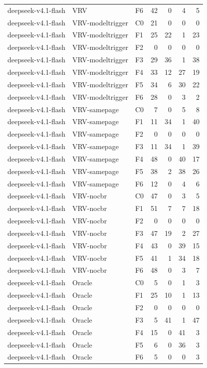 \begin{tabular}{lllrrrr}
deepseek-v4.1-flash & VRV & F6 & 42 & 0 & 4 & 5 \\
deepseek-v4.1-flash & VRV-modeltrigger & C0 & 21 & 0 & 0 & 0 \\
deepseek-v4.1-flash & VRV-modeltrigger & F1 & 25 & 22 & 1 & 23 \\
deepseek-v4.1-flash & VRV-modeltrigger & F2 & 0 & 0 & 0 & 0 \\
deepseek-v4.1-flash & VRV-modeltrigger & F3 & 29 & 36 & 1 & 38 \\
deepseek-v4.1-flash & VRV-modeltrigger & F4 & 33 & 12 & 27 & 19 \\
deepseek-v4.1-flash & VRV-modeltrigger & F5 & 34 & 6 & 30 & 22 \\
deepseek-v4.1-flash & VRV-modeltrigger & F6 & 28 & 0 & 3 & 2 \\
deepseek-v4.1-flash & VRV-samepage & C0 & 7 & 0 & 5 & 8 \\
deepseek-v4.1-flash & VRV-samepage & F1 & 11 & 34 & 1 & 40 \\
deepseek-v4.1-flash & VRV-samepage & F2 & 0 & 0 & 0 & 0 \\
deepseek-v4.1-flash & VRV-samepage & F3 & 11 & 34 & 1 & 39 \\
deepseek-v4.1-flash & VRV-samepage & F4 & 48 & 0 & 40 & 17 \\
deepseek-v4.1-flash & VRV-samepage & F5 & 38 & 2 & 38 & 26 \\
deepseek-v4.1-flash & VRV-samepage & F6 & 12 & 0 & 4 & 6 \\
deepseek-v4.1-flash & VRV-nocbr & C0 & 47 & 0 & 3 & 5 \\
deepseek-v4.1-flash & VRV-nocbr & F1 & 51 & 7 & 7 & 18 \\
deepseek-v4.1-flash & VRV-nocbr & F2 & 0 & 0 & 0 & 0 \\
deepseek-v4.1-flash & VRV-nocbr & F3 & 47 & 19 & 2 & 27 \\
deepseek-v4.1-flash & VRV-nocbr & F4 & 43 & 0 & 39 & 15 \\
deepseek-v4.1-flash & VRV-nocbr & F5 & 41 & 1 & 34 & 18 \\
deepseek-v4.1-flash & VRV-nocbr & F6 & 48 & 0 & 3 & 7 \\
deepseek-v4.1-flash & Oracle & C0 & 5 & 0 & 1 & 3 \\
deepseek-v4.1-flash & Oracle & F1 & 25 & 10 & 1 & 13 \\
deepseek-v4.1-flash & Oracle & F2 & 0 & 0 & 0 & 0 \\
deepseek-v4.1-flash & Oracle & F3 & 5 & 41 & 1 & 47 \\
deepseek-v4.1-flash & Oracle & F4 & 15 & 0 & 41 & 3 \\
deepseek-v4.1-flash & Oracle & F5 & 6 & 0 & 36 & 3 \\
deepseek-v4.1-flash & Oracle & F6 & 5 & 0 & 0 & 3 \\
\bottomrule
\end{tabular}
